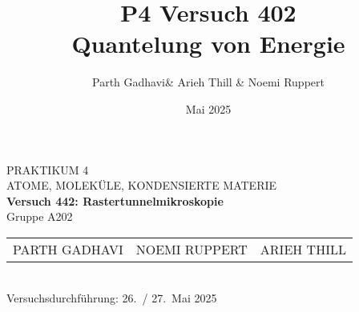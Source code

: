 \documentclass[ngerman,12pt,a4paper]{report}
\title{P4 Versuch 402 \\[1ex] \large Quantelung von Energie}
\author{Parth Gadhavi\& Arieh Thill \& Noemi Ruppert}
\date{Mai 2025}
\begin{document}
\begin{titlepage}
  \centering
  \vspace*{2cm}
  
  {\Large PRAKTIKUM 4}\\[0.5cm]
  {\large ATOME, MOLEKÜLE, KONDENSIERTE MATERIE}\\[1cm]
  
  {\LARGE\bfseries Versuch 442: Rastertunnelmikroskopie}\\[1cm]
  
  Gruppe A202\\[1cm]
  
  \begin{tabular}{lll}
    PARTH GADHAVI   & NOEMI RUPPERT   & ARIEH THILL \\
  \end{tabular}\\[2cm]
  
  Versuchsdurchführung: 26.~/ 27.~Mai 2025
  
  \vfill
\end{titlepage}

\tableofcontents
\clearpage
\clearpage
\setcounter{page}{1}
 
 
 
\appendix
\printbibliography{}
\listoffigures{}
\listoftables{}
 
\end{document}

